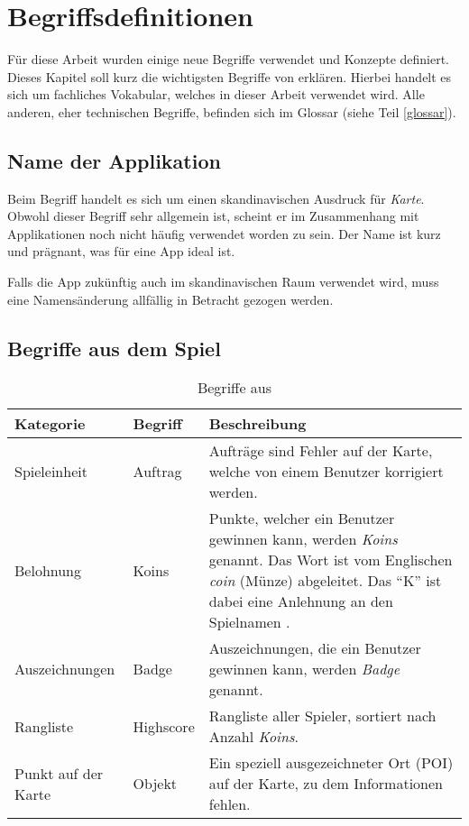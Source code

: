 \chapter{Begriffsdefinitionen}
\label{kort-definitionen}

Für diese Arbeit wurden einige neue Begriffe verwendet und Konzepte definiert.
Dieses Kapitel soll kurz die wichtigsten Begriffe von \kort{} erklären.
Hierbei handelt es sich um fachliches Vokabular, welches in dieser Arbeit verwendet wird.
Alle anderen, eher technischen Begriffe, befinden sich im Glossar (siehe Teil \ref{glossar}).

\section{Name der Applikation}
Beim Begriff \kort{} handelt es sich um einen skandinavischen Ausdruck für \emph{Karte}.
Obwohl dieser Begriff sehr allgemein ist, scheint er im Zusammenhang mit Applikationen noch nicht häufig verwendet worden zu sein.
Der Name ist kurz und prägnant, was für eine App ideal ist.

Falls die App zukünftig auch im skandinavischen Raum verwendet wird, muss eine Namensänderung allfällig in Betracht gezogen werden.

\section{Begriffe aus dem Spiel}

\begin{table}[H]
\centering
\begin{tabular}{|p{0.2\threecelltabwidth}|p{0.12\threecelltabwidth}|p{0.68\threecelltabwidth}|}
\hline 
\small{\textbf{Kategorie}} & \small{\textbf{Begriff}} & \small{\textbf{Beschreibung}} \\
\hline 
Spieleinheit & Auftrag & Aufträge sind Fehler auf der Karte, welche von einem Benutzer korrigiert werden. \\
\hline 
Belohnung & Koins & Punkte, welcher ein Benutzer gewinnen kann, werden \emph{Koins} genannt.
Das Wort ist vom Englischen \emph{coin} (Münze) abgeleitet. 
Das "`K"' ist dabei eine Anlehnung an den Spielnamen \kort{}. \\
\hline 
Auszeichnungen & Badge & Auszeichnungen, die ein Benutzer gewinnen kann, werden \emph{Badge} genannt. \\
\hline 
Rangliste & Highscore & Rangliste aller Spieler, sortiert nach Anzahl \emph{Koins}. \\
\hline 
Punkt auf der Karte & Objekt & Ein speziell ausgezeichneter Ort (\gls{POI}) auf der Karte, zu dem Informationen fehlen. \\
\hline 
\end{tabular}
\caption{Begriffe aus \kort{}}
\label{table-definitionen}
\end{table}